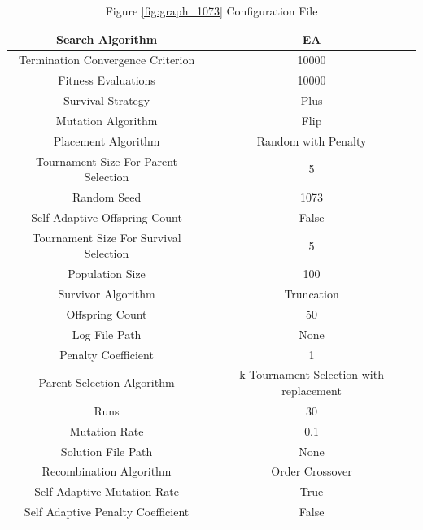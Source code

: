 \documentclass{standalone}
\begin{document}
\begin{table}[!htb]
	\centering
	\caption{Figure \ref{fig:graph_1073} Configuration File}
	\label{tab:graph_1073}
	\begin{tabular}{| c | c |}
		\hline
		Search Algorithm		& EA		 \\
		\hline
		Termination Convergence Criterion		& 10000		 \\
		\hline
		Fitness Evaluations		& 10000		 \\
		\hline
		Survival Strategy		& Plus		 \\
		\hline
		Mutation Algorithm		& Flip		 \\
		\hline
		Placement Algorithm		& Random with Penalty		 \\
		\hline
		Tournament Size For Parent Selection		& 5		 \\
		\hline
		Random Seed		& 1073		 \\
		\hline
		Self Adaptive Offspring Count		& False		 \\
		\hline
		Tournament Size For Survival Selection		& 5		 \\
		\hline
		Population Size		& 100		 \\
		\hline
		Survivor Algorithm		& Truncation		 \\
		\hline
		Offspring Count		& 50		 \\
		\hline
		Log File Path		& None		 \\
		\hline
		Penalty Coefficient		& 1		 \\
		\hline
		Parent Selection Algorithm		& k-Tournament Selection with replacement		 \\
		\hline
		Runs		& 30		 \\
		\hline
		Mutation Rate		& 0.1		 \\
		\hline
		Solution File Path		& None		 \\
		\hline
		Recombination Algorithm		& Order Crossover		 \\
		\hline
		Self Adaptive Mutation Rate		& True		 \\
		\hline
		Self Adaptive Penalty Coefficient		& False		 \\
		\hline
	\end{tabular}
\end{table}
\end{document}
